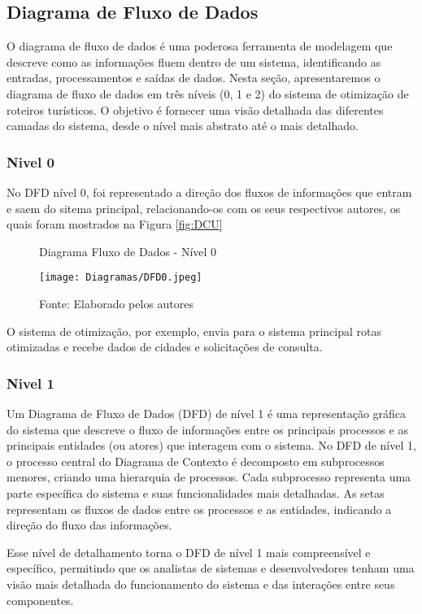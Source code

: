 \subsection{Diagrama de Fluxo de Dados}

O diagrama de fluxo de dados é uma poderosa ferramenta de modelagem que descreve como as informações fluem dentro de um sistema, identificando as entradas, processamentos e saídas de dados. Nesta seção, apresentaremos o diagrama de fluxo de dados em três níveis (0, 1 e 2) do sistema de otimização de roteiros turísticos. O objetivo é fornecer uma visão detalhada das diferentes camadas do sistema, desde o nível mais abstrato até o mais detalhado.

\subsubsection{Nivel 0}

No DFD nível 0, foi representado a direção dos fluxos de informações que entram e saem do sitema principal, relacionando-os com os seus respectivos autores, os quais foram mostrados na Figura \ref{fig:DCU} 
\begin{figure}[H]
    \centering
    \caption{Diagrama Fluxo de Dados - Nível 0}
    \label{fig:DFD0}
    \texttt{[image: Diagramas/DFD0.jpeg]}\\
    \caption*{Fonte: Elaborado pelos autores}
\end{figure}

O sistema de otimização, por exemplo, envia para o sistema principal rotas otimizadas e recebe dados de cidades e solicitações de consulta. 


\subsubsection{Nivel 1}

Um Diagrama de Fluxo de Dados (DFD) de nível 1 é uma representação gráfica do sistema que descreve o fluxo de informações entre os principais processos e as principais entidades (ou atores) que interagem com o sistema.
No DFD de nível 1, o processo central do Diagrama de Contexto é decomposto em subprocessos menores, criando uma hierarquia de processos. Cada subprocesso representa uma parte específica do sistema e suas funcionalidades mais detalhadas. As setas representam os fluxos de dados entre os processos e as entidades, indicando a direção do fluxo das informações.

Esse nível de detalhamento torna o DFD de nível 1 mais compreensível e específico, permitindo que os analistas de sistemas e desenvolvedores tenham uma visão mais detalhada do funcionamento do sistema e das interações entre seus componentes.

